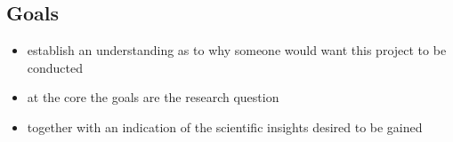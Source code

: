\subsection{Goals}

\begin{itemize}
    \item establish an understanding as to why someone would want this project to be conducted
    \item at the core the goals are the research question 
    \item together with an indication of the scientific insights desired to be gained
\end{itemize}
